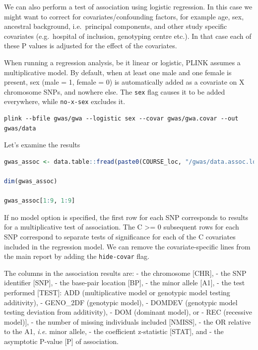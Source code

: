 \documentclass[
]{book}
\newcommand{\passthrough}[1]{#1}
\begin{document}
We can also perform a test of association using logistic regression. In this case we might want to correct for covariates/confounding factors, for example age, sex, ancestral background, i.e.~principal components, and other study specific covariates (e.g.~hospital of inclusion, genotyping centre etc.). In that case each of these P values is adjusted for the effect of the covariates.

When running a regression analysis, be it linear or logistic, PLINK assumes a multiplicative model. By default, when at least one male and one female is present, sex (male = 1, female = 0) is automatically added as a covariate on X chromosome SNPs, and nowhere else. The \passthrough{\lstinline!sex!} flag causes it to be added everywhere, while \passthrough{\lstinline!no-x-sex!} excludes it.

\begin{lstlisting}
plink --bfile gwas/gwa --logistic sex --covar gwas/gwa.covar --out gwas/data
\end{lstlisting}

Let's examine the results

\begin{lstlisting}[language=R]
gwas_assoc <- data.table::fread(paste0(COURSE_loc, "/gwas/data.assoc.logistic"))

dim(gwas_assoc)

gwas_assoc[1:9, 1:9]
\end{lstlisting}

If no model option is specified, the first row for each SNP corresponds to results for a multiplicative test of association. The C \textgreater= 0 subsequent rows for each SNP correspond to separate tests of significance for each of the C covariates included in the regression model. We can remove the covariate-specific lines from the main report by adding the \passthrough{\lstinline!hide-covar!} flag.

The columns in the association results are:
- the chromosome {[}CHR{]},
- the SNP identifier {[}SNP{]},
- the base-pair location {[}BP{]},
- the minor allele {[}A1{]},
- the test performed {[}TEST{]}: ADD (multiplicative model or genotypic model testing additivity),
- GENO\_2DF (genotypic model),
- DOMDEV (genotypic model testing deviation from additivity),
- DOM (dominant model), or
- REC (recessive model){]},
- the number of missing individuals included {[}NMISS{]},
- the OR relative to the A1, \emph{i.e.} minor allele,
- the coefficient z-statistic {[}STAT{]}, and
- the asymptotic P-value {[}P{]} of association.
\end{document}
